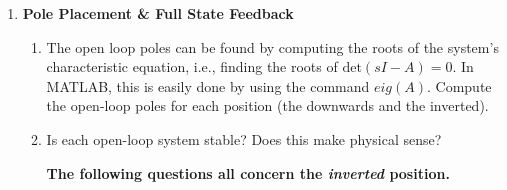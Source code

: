\begin{enumerate}
    \item \textbf{Pole Placement \& Full State Feedback}\label{section:lab3_feedback}
          \begin{enumerate}
              \item The open loop poles can be found by computing the roots of the system's characteristic equation, i.e., finding the roots of \( \text{det}(sI-A)=0 \). In MATLAB, this is easily done by using the command \( eig(A) \). Compute the open-loop poles for each position (the downwards and the inverted).
              \item Is each open-loop system stable? Does this make physical sense?


                    \textbf{The following questions all concern the \emph{inverted} position.}


\end{enumerate}
\end{enumerate}
